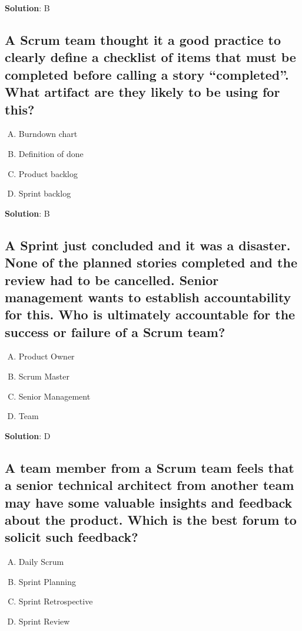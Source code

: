 \textbf{Solution}: B


\subsection{A Scrum team thought it a good practice to clearly define a checklist of items that must be completed before calling a story \enquote{completed}.  What artifact are they likely to be using for this?}
\begin{enumerate}[A)]
  \item Burndown chart
  \item Definition of done
  \item Product backlog
  \item Sprint backlog
\end{enumerate}

\textbf{Solution}: B


\subsection{A Sprint just concluded and it was a disaster. None of the planned stories completed and the review had to be cancelled. Senior management wants to establish accountability for this.  Who is ultimately accountable for the success or failure of a Scrum team?}
\begin{enumerate}[A)]
  \item Product Owner
  \item Scrum Master
  \item Senior Management
  \item Team
\end{enumerate}

\textbf{Solution}: D


\subsection{A team member from a Scrum team feels that a senior technical architect from another team may have some valuable insights and feedback about the product. Which is the best forum to solicit such feedback?}
\begin{enumerate}[A)]
  \item Daily Scrum
  \item Sprint Planning
  \item Sprint Retrospective
  \item Sprint Review
\end{enumerate}

